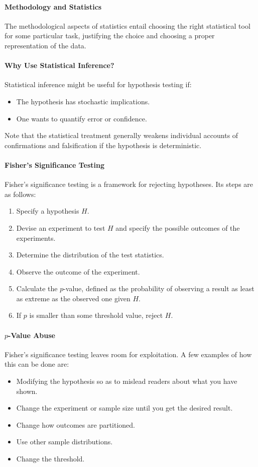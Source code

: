 \paragraph{Methodology and Statistics}
The methodological aspects of statistics entail choosing the right statistical tool for some particular task, justifying the choice and choosing a proper representation of the data.

\paragraph{Why Use Statistical Inference?}
Statistical inference might be useful for hypothesis testing if:
\begin{itemize}
	\item The hypothesis has stochastic implications.
	\item One wants to quantify error or confidence.
\end{itemize}

Note that the statistical treatment generally weakens individual accounts of confirmations and falsification if the hypothesis is deterministic.

\paragraph{Fisher's Significance Testing}
Fisher's significance testing is a framework for rejecting hypotheses. Its steps are as follows:

\begin{enumerate}
	\item Specify a hypothesis $H$.
	\item Devise an experiment to test $H$ and specify the possible outcomes of the experiments.
	\item Determine the distribution of the test statistics.
	\item Observe the outcome of the experiment.
	\item Calculate the $p$-value, defined as the probability of observing a result as least as extreme as the observed one given $H$.
	\item If $p$ is smaller than some threshold value, reject $H$.
\end{enumerate}

\paragraph{$p$-Value Abuse}
Fisher's significance testing leaves room for exploitation. A few examples of how this can be done are:
\begin{itemize}
	\item Modifying the hypothesis so as to mislead readers about what you have shown.
	\item Change the experiment or sample size until you get the desired result.
	\item Change how outcomes are partitioned.
	\item Use other sample distributions.
	\item Change the threshold.
\end{itemize}

